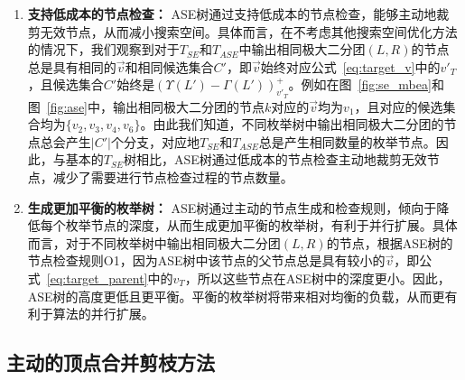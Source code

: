 \begin{enumerate}
  \item \textbf{支持低成本的节点检查：}  ASE树通过支持低成本的节点检查，能够主动地裁剪无效节点，从而减小搜索空间。具体而言，在不考虑其他搜索空间优化方法的情况下，我们观察到对于$T_{SE}$和$T_{ASE}$中输出相同极大二分团$(L,R)$的节点总是具有相同的$\vec{v}$和相同候选集合$C'$，即$\vec{v}$始终对应公式~\ref{eq:target_v}中的$v'_T$，且候选集合$C'$始终是$(\Upsilon(L') - \Gamma(L'))_{v'_T}^+$。例如在图~\ref{fig:se_mbea}和图~\ref{fig:ase}中，输出相同极大二分团的节点$k$对应的$\vec{v}$均为$v_1$，且对应的候选集合均为$\{v_2,v_3,v_4,v_6\}$。由此我们知道，不同枚举树中输出相同极大二分团的节点总会产生$|C'|$个分支，对应地$T_{SE}$和$T_{ASE}$总是产生相同数量的枚举节点。因此，与基本的$T_{SE}$树相比，ASE树通过低成本的节点检查主动地裁剪无效节点，减少了需要进行节点检查过程的节点数量。
  

  \item \textbf{生成更加平衡的枚举树：} ASE树通过主动的节点生成和检查规则，倾向于降低每个枚举节点的深度，从而生成更加平衡的枚举树，有利于并行扩展。具体而言，对于不同枚举树中输出相同极大二分团$(L,R)$的节点，根据ASE树的节点检查规则O1，因为ASE树中该节点的父节点总是具有较小的$\vec{v}$，即公式~\ref{eq:target_parent}中的$v_T$，所以这些节点在ASE树中的深度更小。因此，ASE树的高度更低且更平衡。平衡的枚举树将带来相对均衡的负载，从而更有利于算法的并行扩展。

\end{enumerate}



\subsection{主动的顶点合并剪枝方法}
\label{subsec:amp}


